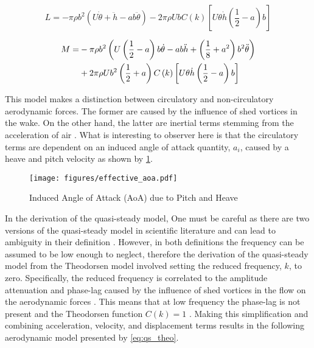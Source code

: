 \begin{equation}
    \label{eq:theodorsen_lift}
    L = -\pi\rho b^2
    \left(U\dot{\theta} + \ddot{h} -ab\ddot{\theta}\right)
    - 2 \pi\rho U b C\left(k\right)
    \left[ U\theta \dot{h} \left(\frac{1}{2} - a \right)b\right]
\end{equation}

\begin{align}
    \label{eq:theodorsen_moment}
    M = &-\pi\rho b^2
    \left(U\left(\frac{1}{2} - a \right)b\dot{\theta} -
    ab\ddot{h} +\left(\frac{1}{8} + a^2\right)b^2\ddot{\theta}\right) \\ \notag
    &+ 2 \pi\rho U b^2 \left(\frac{1}{2} + a \right) C\left(k\right)
    \left[ U\theta \dot{h} \left(\frac{1}{2} - a \right)b\right]
\end{align}

This model makes a distinction between circulatory and non-circulatory
aerodynamic forces. The former are caused by the influence of shed vortices in
the wake. On the other hand, the latter are inertial terms stemming from the
acceleration of air \autocite[p.156]{wrightIntroductionAircraftAeroelasticity}.
What is interesting to observer here is that the circulatory terms are
dependent on an induced angle of attack quantity, $a_i$, caused by a heave and
pitch velocity as shown by \cref{fig:induced_aoa}.

\begin{figure}[H]
    \centering
    \texttt{[image: figures/effective\_aoa.pdf]}
    \caption{Induced Angle of Attack (AoA) due to Pitch and Heave}
    \label{fig:induced_aoa}
\end{figure}

In the derivation of the quasi-steady model, One must be careful as there are
two versions of the quasi-steady model in scientific literature and can lead to
ambiguity in their definition
\autocite[p.95]{dowellModernCourseAeroelasticity2015}. However, in both
definitions the frequency can be assumed to be low enough to neglect, therefore
the derivation of the quasi-steady model from the Theodorsen model involved
setting the reduced frequency, $k$, to zero. Specifically, the reduced
frequency is correlated to the amplitude attenuation and phase-lag caused by
the influence of shed vortices in the flow on the aerodynamic forces
\autocite[p.156]{wrightIntroductionAircraftAeroelasticity}. This means that at
low frequency the phase-lag is not present and the Theodorsen function
$C\left(k\right) = 1$
\autocite[p.158-160]{wrightIntroductionAircraftAeroelasticity}. Making this
simplification and combining acceleration, velocity, and displacement terms
results in the following aerodynamic model presented by \cref{eq:qs_theo}.

